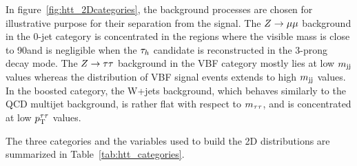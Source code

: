 In figure~\ref{fig:htt_2Dcategories}, the background processes are chosen for illustrative 
purpose for their separation from 
the signal. The $Z\to\mu\mu$ background in the 0-jet category is concentrated in 
the regions where the visible mass is close to 90\GeV and is negligible when the $\tau_{h}$ 
candidate is reconstructed in the 3-prong decay mode. The $Z\to\tau\tau$ background in 
the VBF category mostly lies at low $m_\mathrm{jj}$ values whereas the distribution of VBF signal 
events extends to high $m_\mathrm{jj}$ values. In the boosted category, the W+jets background, 
which behaves similarly to the QCD multijet background, is rather flat with respect to $m_{\tau\tau}$, and 
is concentrated at low $p_\mathrm{T}^{\tau\tau}$ values.

The three categories and the variables used to build the 2D distributions are summarized in
Table~\ref{tab:htt_categories}. 

